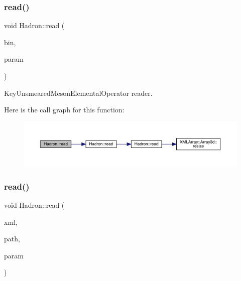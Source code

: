 \subsubsection{\texorpdfstring{read()}{read()}\hspace{0.1cm}{\footnotesize\ttfamily [26/94]}}
{\footnotesize\ttfamily void Hadron\+::read (\begin{DoxyParamCaption}\item[{\mbox{\hyperlink{classADATIO_1_1BinaryReader}{Binary\+Reader}} \&}]{bin,  }\item[{\mbox{\hyperlink{structHadron_1_1KeyUnsmearedMesonElementalOperator__t}{Key\+Unsmeared\+Meson\+Elemental\+Operator\+\_\+t}} \&}]{param }\end{DoxyParamCaption})}



Key\+Unsmeared\+Meson\+Elemental\+Operator reader. 

Here is the call graph for this function\+:
\nopagebreak
\begin{figure}[H]
\begin{center}
\leavevmode
\includegraphics[width=350pt]{d1/daf/namespaceHadron_a1a172c91f55bd8989d9751c7f8b5ac28_cgraph}
\end{center}
\end{figure}
\mbox{\label{namespaceHadron_a0651834c5f37836ea0e1e081b4214546}} 
\subsubsection{\texorpdfstring{read()}{read()}\hspace{0.1cm}{\footnotesize\ttfamily [27/94]}}
{\footnotesize\ttfamily void Hadron\+::read (\begin{DoxyParamCaption}\item[{\mbox{\hyperlink{classADATXML_1_1XMLReader}{X\+M\+L\+Reader}} \&}]{xml,  }\item[{const std\+::string \&}]{path,  }\item[{\mbox{\hyperlink{structHadron_1_1KeyGlueElementalOperator__t}{Key\+Glue\+Elemental\+Operator\+\_\+t}} \&}]{param }\end{DoxyParamCaption})}



